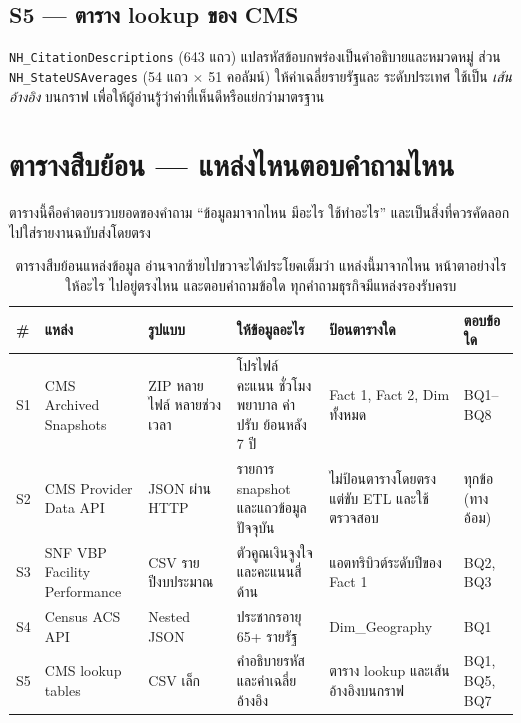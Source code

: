 \documentclass[11pt,a4paper]{article}
\newcommand{\sansall}{\sffamily}
\newcommand{\code}[1]{\texttt{#1}}
\begin{document}
\subsection{S5 --- ตาราง lookup ของ CMS}
\code{NH_CitationDescriptions} (643 แถว) แปลรหัสข้อบกพร่องเป็นคำอธิบายและหมวดหมู่
ส่วน \code{NH_StateUSAverages} (54 แถว $\times$ 51 คอลัมน์) ให้ค่าเฉลี่ยรายรัฐและ
ระดับประเทศ ใช้เป็น \emph{เส้นอ้างอิง} บนกราฟ เพื่อให้ผู้อ่านรู้ว่าค่าที่เห็นดีหรือแย่กว่ามาตรฐาน

\section{ตารางสืบย้อน --- แหล่งไหนตอบคำถามไหน}

ตารางนี้คือคำตอบรวบยอดของคำถาม ``ข้อมูลมาจากไหน มีอะไร ใช้ทำอะไร''
และเป็นสิ่งที่ควรคัดลอกไปใส่รายงานฉบับส่งโดยตรง

\begin{table}[H]\centering
\begin{adjustbox}{max width=\linewidth}
\small
\begin{tabular}{L{0.8cm} L{4.4cm} L{2.3cm} L{3.6cm} L{4.0cm} L{2.0cm}}
\toprule
\sansall\bfseries \# & \sansall\bfseries แหล่ง & \sansall\bfseries รูปแบบ &
\sansall\bfseries ให้ข้อมูลอะไร & \sansall\bfseries ป้อนตารางใด &
\sansall\bfseries ตอบข้อใด \\
\midrule
S1 & CMS Archived Snapshots & ZIP หลายไฟล์ หลายช่วงเวลา &
  โปรไฟล์ คะแนน ชั่วโมงพยาบาล ค่าปรับ ย้อนหลัง 7 ปี &
  Fact 1, Fact 2, Dim ทั้งหมด & BQ1--BQ8 \\
\addlinespace
S2 & CMS Provider Data API & JSON ผ่าน HTTP &
  รายการ snapshot และแถวข้อมูลปัจจุบัน &
  ไม่ป้อนตารางโดยตรง แต่ขับ ETL และใช้ตรวจสอบ & ทุกข้อ (ทางอ้อม) \\
\addlinespace
S3 & SNF VBP Facility Performance & CSV รายปีงบประมาณ &
  ตัวคูณเงินจูงใจและคะแนนสี่ด้าน &
  แอตทริบิวต์ระดับปีของ Fact 1 & BQ2, BQ3 \\
\addlinespace
S4 & Census ACS API & Nested JSON &
  ประชากรอายุ 65+ รายรัฐ & Dim\_Geography & BQ1 \\
\addlinespace
S5 & CMS lookup tables & CSV เล็ก &
  คำอธิบายรหัส และค่าเฉลี่ยอ้างอิง & ตาราง lookup และเส้นอ้างอิงบนกราฟ &
  BQ1, BQ5, BQ7 \\
\bottomrule
\end{tabular}
\end{adjustbox}
\caption{ตารางสืบย้อนแหล่งข้อมูล อ่านจากซ้ายไปขวาจะได้ประโยคเต็มว่า แหล่งนี้มาจากไหน หน้าตาอย่างไร ให้อะไร ไปอยู่ตรงไหน และตอบคำถามข้อใด ทุกคำถามธุรกิจมีแหล่งรองรับครบ}
\end{table}
\end{document}
